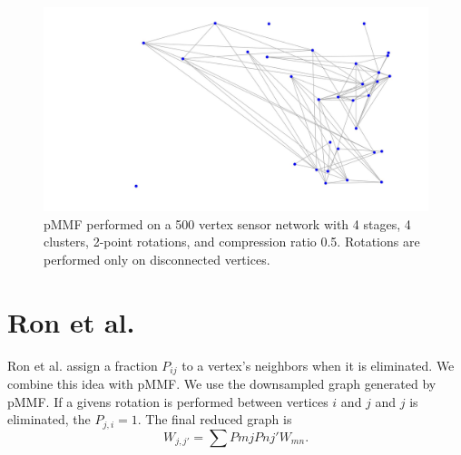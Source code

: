 \documentclass[a4paper]{article}
\begin{document}
\begin{figure}[H]
\includegraphics[width = 7 cm]{disconnected_pMMF/discon_5}

\caption{pMMF performed on a 500 vertex sensor network with 4 stages, 4 clusters, 2-point rotations, and compression ratio 0.5. Rotations are performed only on disconnected vertices.}
\end{figure}

\section{Ron et al.}

Ron et al. assign a fraction $P_{ij}$ to a vertex's neighbors when it is eliminated. We combine this idea with pMMF. We use the downsampled graph generated by pMMF. If a givens rotation is performed between vertices $i$ and $j$ and $j$ is eliminated, the $P_{j, i} = 1$. The final reduced graph is $$W_{j,j'} = \sum P{mj} P{nj'} W_{mn}.$$
\end{document}
